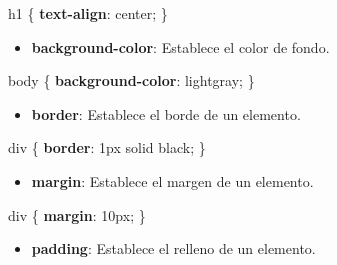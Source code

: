 \documentclass[
  a4paper,
  DIV=11,
  numbers=noendperiod,
  onepage,
  openany]{scrreprt}
\newenvironment{Shaded}{\begin{snugshade}}{\end{snugshade}}
\newcommand{\CharTok}[1]{\textcolor[rgb]{0.13,0.47,0.30}{#1}}
\newcommand{\ConstantTok}[1]{\textcolor[rgb]{0.56,0.35,0.01}{#1}}
\newcommand{\DataTypeTok}[1]{\textcolor[rgb]{0.68,0.00,0.00}{#1}}
\newcommand{\DecValTok}[1]{\textcolor[rgb]{0.68,0.00,0.00}{#1}}
\newcommand{\KeywordTok}[1]{\textcolor[rgb]{0.00,0.23,0.31}{\textbf{#1}}}
\newcommand{\NormalTok}[1]{\textcolor[rgb]{0.00,0.23,0.31}{#1}}
\newcommand{\OperatorTok}[1]{\textcolor[rgb]{0.37,0.37,0.37}{#1}}
\providecommand{\tightlist}{%
  \setlength{\itemsep}{0pt}\setlength{\parskip}{0pt}}\usepackage{longtable,booktabs,array}
\begin{document}
\begin{tcolorbox}
\begin{Shaded}
\begin{Highlighting}[]
\NormalTok{h1 \{}
  \KeywordTok{text{-}align}\CharTok{:} \DecValTok{center}\OperatorTok{;}
\NormalTok{\}}
\end{Highlighting}
\end{Shaded}

\begin{itemize}
\tightlist
\item
  \textbf{background-color}: Establece el color de fondo.
\end{itemize}

\begin{Shaded}
\begin{Highlighting}[]
\NormalTok{body \{}
  \KeywordTok{background{-}color}\CharTok{:} \ConstantTok{lightgray}\OperatorTok{;}
\NormalTok{\}}
\end{Highlighting}
\end{Shaded}

\begin{itemize}
\tightlist
\item
  \textbf{border}: Establece el borde de un elemento.
\end{itemize}

\begin{Shaded}
\begin{Highlighting}[]
\NormalTok{div \{}
  \KeywordTok{border}\CharTok{:} \DecValTok{1}\DataTypeTok{px} \DecValTok{solid} \ConstantTok{black}\OperatorTok{;}
\NormalTok{\}}
\end{Highlighting}
\end{Shaded}

\begin{itemize}
\tightlist
\item
  \textbf{margin}: Establece el margen de un elemento.
\end{itemize}

\begin{Shaded}
\begin{Highlighting}[]
\NormalTok{div \{}
  \KeywordTok{margin}\CharTok{:} \DecValTok{10}\DataTypeTok{px}\OperatorTok{;}
\NormalTok{\}}
\end{Highlighting}
\end{Shaded}

\begin{itemize}
\tightlist
\item
  \textbf{padding}: Establece el relleno de un elemento.
\end{itemize}


\end{tcolorbox}
\end{document}
